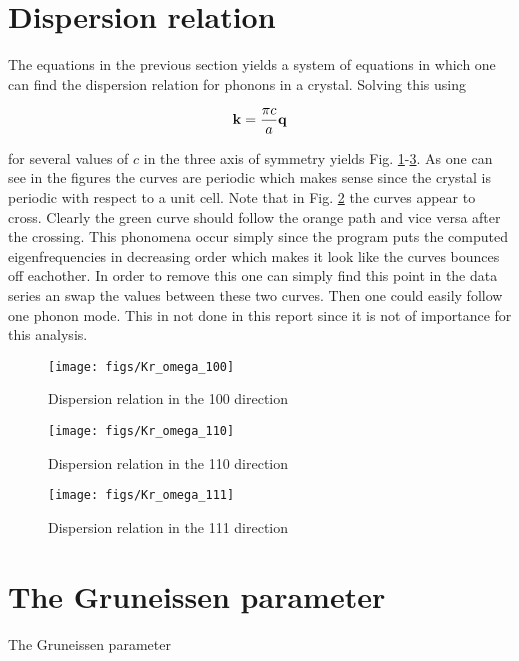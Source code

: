 \section{Dispersion relation}

The equations in the previous section yields a system of equations in which one can find the dispersion relation for phonons in a crystal. Solving this using

\begin{equation*}
  \mathbf{k} = \frac{\pi c}{a}\mathbf{q}
\end{equation*}

for several values of $c$ in the three axis of symmetry yields Fig. \ref{fig:100}-\ref{fig:111}. As one can see in the figures the curves are periodic which makes sense since the crystal is periodic with respect to a unit cell. Note that in Fig. \ref{fig:110} the curves appear to cross. Clearly the green curve should follow the orange path and vice versa after the crossing. This phonomena occur simply since the program puts the computed eigenfrequencies in decreasing order which makes it look like the curves bounces off eachother. In order to remove this one can simply find this point in the data series an swap the values between these two curves. Then one could easily follow one phonon mode. This in not done in this report since it is not of importance for this analysis.


\begin{figure}[H]
  \centering
  \texttt{[image: figs/Kr\_omega\_100]}
  \caption{Dispersion relation in the 100 direction}
  \label{fig:100}
\end{figure}

\begin{figure}[H]
  \centering
  \texttt{[image: figs/Kr\_omega\_110]}
  \caption{Dispersion relation in the 110 direction}
  \label{fig:110}
\end{figure}

\begin{figure}[H]
  \centering
  \texttt{[image: figs/Kr\_omega\_111]}
  \caption{Dispersion relation in the 111 direction}
  \label{fig:111}
\end{figure}

\section{The Gruneissen parameter}

The Gruneissen parameter

